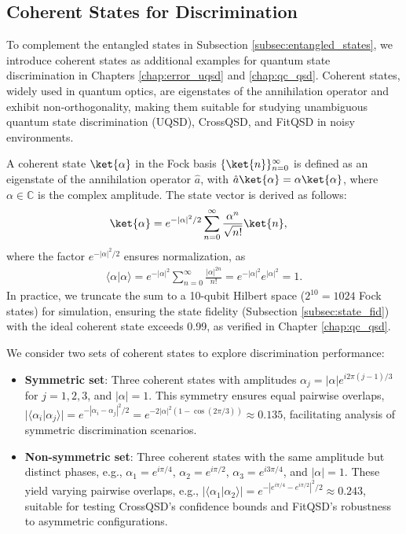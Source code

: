 \subsection{Coherent States for Discrimination}
\label{subsec:coherent_states}
To complement the entangled states in Subsection \ref{subsec:entangled_states},
we introduce coherent states as additional examples for quantum state
discrimination in Chapters \ref{chap:error_uqsd} and \ref{chap:qc_qsd}.
Coherent states, widely used in quantum optics, are eigenstates of the
annihilation operator and exhibit non-orthogonality, making them suitable for
studying unambiguous quantum state discrimination (UQSD), CrossQSD, and FitQSD
in noisy environments.

A coherent state \(\ket{\alpha}\) in the Fock basis \(\{\ket{n}\}_{n=0}^\infty\)
is defined as an eigenstate of the annihilation operator \(\hat{a}\), with
\(\hat{a} \ket{\alpha} = \alpha \ket{\alpha}\), where \(\alpha \in \mathbb{C}\)
is the complex amplitude.
The state vector is derived as follows:
\begin{align}
    \ket{\alpha} & = e^{-|\alpha|^2/2} \sum_{n=0}^\infty \frac{\alpha^n}{\sqrt{n!}} \ket{n}, \label{eq:coherent_state_vector}
\end{align}
where the factor \(e^{-|\alpha|^2/2}\) ensures normalization, as
\begin{align}
    \langle \alpha | \alpha \rangle = e^{-|\alpha|^2} \sum_{n=0}^\infty \frac{|\alpha|^{2n}}{n!} = e^{-|\alpha|^2} e^{|\alpha|^2} = 1.
\end{align}
In practice, we truncate the sum to a 10-qubit Hilbert space
(\(2^{10} = 1024\) Fock states) for simulation, ensuring the state fidelity
(Subsection \ref{subsec:state_fid}) with the ideal coherent state exceeds 0.99,
as verified in Chapter \ref{chap:qc_qsd}.

We consider two sets of coherent states to explore discrimination performance:
\begin{itemize}
    \item \textbf{Symmetric set}: Three coherent states with amplitudes
          \(\alpha_j = |\alpha| e^{i 2\pi (j-1)/3}\) for \(j = 1, 2, 3\),
          and \(|\alpha| = 1\). This symmetry ensures equal pairwise overlaps,
          \(|\langle \alpha_i | \alpha_j \rangle| = e^{-|\alpha_i - \alpha_j|^2/2} = e^{-2|\alpha|^2 (1 - \cos(2\pi/3))} \approx 0.135\),
          facilitating analysis of symmetric discrimination scenarios.
    \item \textbf{Non-symmetric set}: Three coherent states with the same
          amplitude but distinct phases, e.g., \(\alpha_1 = e^{i \pi/4}\),
          \(\alpha_2 = e^{i \pi/2}\), \(\alpha_3 = e^{i 3\pi/4}\),
          and \(|\alpha| = 1\).
          These yield varying pairwise overlaps, e.g.,
          \(|\langle \alpha_1 | \alpha_2 \rangle| = e^{-|e^{i \pi/4} - e^{i \pi/2}|^2/2} \approx 0.243\),
          suitable for testing CrossQSD’s confidence bounds and FitQSD’s robustness to asymmetric configurations.
\end{itemize}

